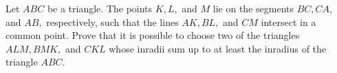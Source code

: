 Let 
$ABC$
 be a triangle. The points 
$K, L,$
 and 
$M$
 lie on the segments 
$BC, CA,$
 and 
$AB,$
 respectively, such that the lines 
$AK, BL,$
 and 
$CM$
 intersect in a common point. Prove that it is possible to choose two of the triangles 
$ALM, BMK,$
 and 
$CKL$
 whose inradii sum up to at least the inradius of the triangle 
$ABC$.
